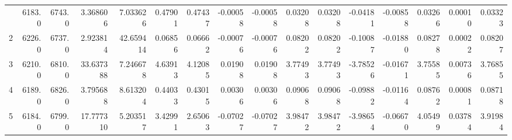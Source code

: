 \begin{longtable}{rrrrrrrrrrrrrrrr}
\bottomrule
\endlastfoot
           1 &          6183.0 &          6743.0 &            3.368606 &              7.033626 &                    0.47901 &                           0.47437 &                                    -0.00058 &                                   -0.00058 &                                            0.03208 &                                           0.03208 &                                      -0.04181 &                                           -0.00858 &                 0.03266 &                0.00010 &                   0.03323 \\
           2 &          6226.0 &          6737.0 &            2.923814 &             42.659414 &                    0.06856 &                           0.06662 &                                    -0.00076 &                                   -0.00076 &                                            0.08202 &                                           0.08202 &                                      -0.10087 &                                           -0.01880 &                 0.08278 &                0.00022 &                   0.08207 \\
           3 &          6210.0 &          6810.0 &           33.637388 &              7.246678 &                    4.63913 &                           4.12085 &                                     0.01908 &                                    0.01908 &                                            3.77493 &                                           3.77493 &                                      -3.78526 &                                           -0.01671 &                 3.75585 &                0.00736 &                   3.76855 \\
           4 &          6189.0 &          6826.0 &            3.795688 &              8.613204 &                    0.44033 &                           0.43015 &                                     0.00306 &                                    0.00306 &                                            0.09068 &                                           0.09068 &                                      -0.09882 &                                           -0.01164 &                 0.08762 &                0.00081 &                   0.08718 \\
           5 &          6184.0 &          6799.0 &           17.777310 &              5.203517 &                    3.42991 &                           2.65063 &                                    -0.07027 &                                   -0.07027 &                                            3.98472 &                                           3.98472 &                                      -3.98654 &                                           -0.06670 &                 4.05499 &                0.03784 &                   3.91984 \\

\end{longtable}
